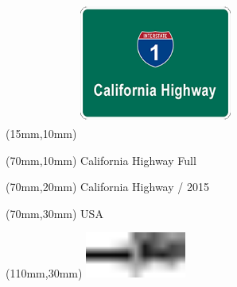 \null\newpage
\begin{textblock*}{50mm}(15mm,10mm)%
\includegraphics[width=50mm]{LG/CAL.png}
\end{textblock*}
\begin{textblock*}{130mm}(70mm,10mm)%
{\fontsize{20}{20}\selectfont California Highway Full}\\
\end{textblock*}
\begin{textblock*}{120mm}(70mm,20mm)%
{\fontsize{16}{16}\selectfont California Highway / 2015}\\
\end{textblock*}
\begin{textblock*}{120mm}(70mm,30mm)%
{\fontsize{12}{12}\selectfont USA}
\end{textblock*}
\begin{textblock*}{30mm}(110mm,30mm)%
\centering
\includegraphics[height=15mm]{icons/tofinish.pdf}
\end{textblock*}
